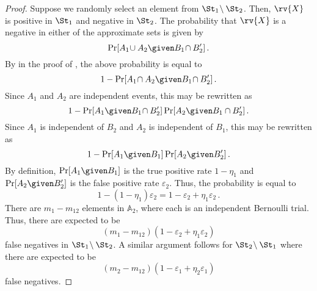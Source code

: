 \documentclass[ ../main.tex]{subfiles}
\begin{document}
\begin{proof}
Suppose we randomly select an element from $\St_1 \! \setminus \St_2$. Then, $\rv{X}$ is positive in $\St_1$ and negative in $\St_2$. The probability that $\rv{X}$ is a negative in either of the approximate sets is given by
\begin{equation}
    \Pr[A_1 \! \cup A_2 \given B_1 \! \cap B_2']\,.
\end{equation}
By  in the proof of , the above probability is equal to
\begin{equation}
    1 - \Pr[A_1 \! \cap A_2 \given B_1 \! \cap B_2']\,.
\end{equation}
Since $A_1$ and $A_2$ are independent events, this may be rewritten as
\begin{equation}
    1 - \Pr[A_1 \given B_1 \! \cap B_2'] \Pr[A_2 \given B_1 \cap B_2']\,.
\end{equation}
Since $A_1$ is independent of $B_2$ and $A_2$ is independent of $B_1$, this may be rewritten as
\begin{equation}
    1 - \Pr[A_1 \given B_1] \Pr[A_2 \given B_2']\,.
\end{equation}
By definition, $\Pr[A_1 \given B_1]$ is the true positive rate $1 - \eta_1$ and $\Pr[A_2 \given B_2']$ is the false positive rate $\varepsilon_2$. Thus, the probability is equal to
\begin{equation}
    1 - (1 - \eta_1) \varepsilon_2 = 1 - \varepsilon_2 + \eta_1 \varepsilon_2\,.
\end{equation}
There are $m_1 - m_{1 2}$ elements in $\mathbb{A}_2$, where each is an independent Bernoulli trial. Thus, there are expected to be
\begin{equation}
\label{eq:proof_union_fn_2}
    (m_1 - m_{1 2}) \left(1 - \varepsilon_2 + \eta_1 \varepsilon_2\right)
\end{equation}
false negatives in $\St_1 \! \setminus \St_2$. A similar argument follows for $\St_2 \! \setminus \St_1$ where there are expected to be
\begin{equation}
\label{eq:proof_union_fn_3}
    (m_2 - m_{1 2}) \left(1 - \varepsilon_1 + \eta_2 \varepsilon_1\right)
\end{equation}
false negatives.


\end{proof}
\end{document}
